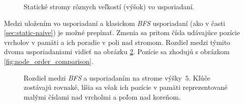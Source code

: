 \begin{figure}
    \hspace{0.5cm}
    \caption{Statické stromy rôznych veľkostí (výšok) vo \vEB usporiadaní.}
    \label{fig:ss_static_sizes}
\end{figure}

Medzi uložením vo \vEB usporiadaní a klasickom \emph{BFS} usporiadaní (ako v časti \ref{sec:static-naive}) je možné prepínať. Zmenia sa pritom čísla udávajúce pozície vrcholov v pamäti a ich poradie v poli nad stromom. Rozdiel medzi týmito dvoma usporiadaniami vidieť na obrázku \ref{fig:ss_static_order}. Pozície sa zhodujú s obrázkom \ref{fig:node_order_comparison}. 

\begin{figure}
    \centering
    \caption{Rozdiel medzi \emph{BFS} a \vEB usporiadaním na strome výšky~$5$. Kľúče zostávajú rovnaké, líšia sa však ich pozície v pamäti reprezentované malými číslami nad vrcholmi a poľom nad koreňom.}
    \label{fig:ss_static_order}
\end{figure}

